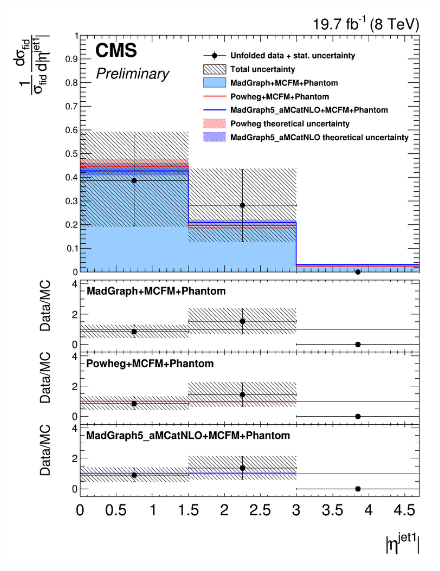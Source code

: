 \begin{figure}[hbtp]
\begin{center}
    \includegraphics[width=\cmsFigWidth]{Figures/DiffCrossSecZZTo4eEtaJet1_Unfolded_fr_MadGraph_norm.png}     

\end{center}
\end{figure}
